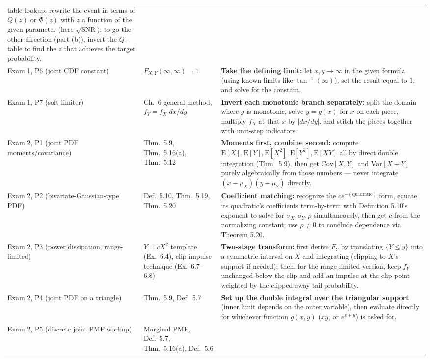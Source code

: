 \documentclass[10pt]{article}
\newcommand{\E}[1]{\mathrm{E}\left[#1\right]}
\newcommand{\Var}[1]{\mathrm{Var}\left[#1\right]}
\newcommand{\Cov}[1]{\mathrm{Cov}\left[#1\right]}
\begin{document}
{\begin{longtable}{@{}p{2.5cm}p{4.7cm}p{6.4cm}@{}}
{table-lookup:} rewrite the event in terms of $Q(z)$ or $\Phi(z)$ with $z$ a function of the
given parameter (here $\sqrt{\text{SNR}}$); to go the other direction (part (b)), invert the
$Q$-table to find the $z$ that achieves the target probability.\\[4pt]
Exam 1, P6 (joint CDF constant) & $F_{X,Y}(\infty,\infty)=1$ & \textbf{Take the defining
limit:} let $x,y\to\infty$ in the given formula (using known limits like $\tan^{-1}(\infty)$),
set the result equal to 1, and solve for the constant.\\[4pt]
Exam 1, P7 (soft limiter) & Ch.\ 6 general method, $f_Y=f_X|dx/dy|$ & \textbf{Invert each
monotonic branch separately:} split the domain where $g$ is monotonic, solve $y=g(x)$ for $x$
on each piece, multiply $f_X$ at that $x$ by $|dx/dy|$, and stitch the pieces together with
unit-step indicators.\\[4pt]
Exam 2, P1 (joint PDF moments/covariance) & Thm.\ 5.9, Thm.\ 5.16(a), Thm.\ 5.12 &
\textbf{Moments first, combine second:} compute $\E{X},\E{Y},\E{X^2},\E{Y^2},\E{XY}$ all by
direct double integration (Thm.\ 5.9), then get $\Cov{X,Y}$ and $\Var{X+Y}$ purely
algebraically from those numbers --- never integrate $(x-\mu_X)(y-\mu_Y)$ directly.\\[4pt]
Exam 2, P2 (bivariate-Gaussian-type PDF) & Def.\ 5.10, Thm.\ 5.19, Thm.\ 5.20 &
\textbf{Coefficient matching:} recognize the $ce^{-(\text{quadratic})}$ form, equate its
quadratic's coefficients term-by-term with Definition 5.10's exponent to solve for
$\sigma_X,\sigma_Y,\rho$ simultaneously, then get $c$ from the normalizing constant; use
$\rho\ne0$ to conclude dependence via Theorem 5.20.\\[4pt]
Exam 2, P3 (power dissipation, range-limited) & $Y=cX^2$ template (Ex.\ 6.4), clip-impulse
technique (Ex.\ 6.7--6.8) & \textbf{Two-stage transform:} first derive $F_Y$ by translating
$\{Y\le y\}$ into a symmetric interval on $X$ and integrating (clipping to $X$'s support if
needed); then, for the range-limited version, keep $f_Y$ unchanged below the clip and add an
impulse at the clip point weighted by the clipped-away tail probability.\\[4pt]
Exam 2, P4 (joint PDF on a triangle) & Thm.\ 5.9, Def.\ 5.7 & \textbf{Set up the double
integral over the triangular support} (inner limit depends on the outer variable), then
evaluate directly for whichever function $g(x,y)$ ($xy$, or $e^{x+y}$) is asked for.\\[4pt]
Exam 2, P5 (discrete joint PMF workup) & Marginal PMF, Def.\ 5.7, Thm.\ 5.16(a), Def.\ 5.6 &

\end{longtable}}
\end{document}
